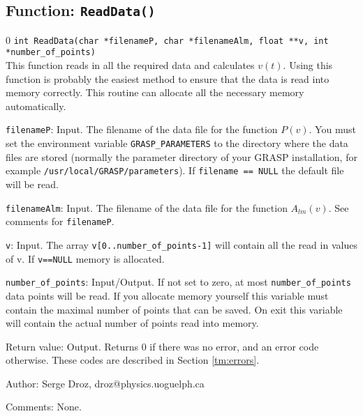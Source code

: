 \subsection{Function: {\tt ReadData()}}
\setcounter{equation}0
{\tt int ReadData(char *filenameP,  char *filenameAlm, 
             float **v, int *number\_of\_points)}\\
This function reads in all the required data and calculates $v(t)$. Using this
function is probably the easiest method to ensure that the data is read into
memory correctly. This routine can allocate all the necessary memory automatically.
\begin{description}
\item{{\tt filenameP}}: Input. The filename of the data file for the function
$P(v)$. You must set the environment variable {\tt GRASP\_PARAMETERS} to the
  directory where the data files are stored (normally the parameter directory of
  your GRASP installation, for example {\tt /usr/local/GRASP/parameters}). If {\tt filename == NULL} the default file will be
  read.
\item{{\tt filenameAlm}}: Input. The filename of the data file for the function
$A_{lm}(v)$. See comments for {\tt filenameP}.
\item{{\tt v}}: Input. The array {\tt v[0..number\_of\_points-1]} will
contain all the read in values of v. If {\tt v==NULL} memory is allocated.
\item{{\tt number\_of\_points}}: Input/Output. If not set to zero, at most
 {\tt *number\_of\_points} data points  will be read. If you allocate memory 
 yourself this variable must contain the maximal number of points that can be
 saved.
 On exit this variable will
contain the actual number of points read into memory.

\item{Return value}: Output. Returns $0$ if there was
   no error, and an error code otherwise. These codes are described in Section \ref{tm:errors}.
\end{description}
				      
\begin{description}
\item{Author:} Serge Droz, droz@physics.uoguelph.ca
\item{Comments:} None.
\end{description}

\clearpage
%
%

